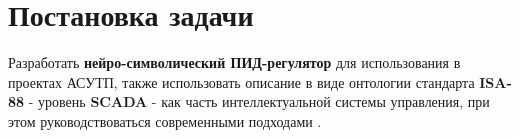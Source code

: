 \section{Постановка задачи}

Разработать \textbf{нейро-символический ПИД-регулятор} для использования в проектах АСУТП, также использовать описание в виде онтологии стандарта \textbf{ISA-88} - уровень \textbf{SCADA} - как часть интеллектуальной системы управления, при этом руководствоваться современными подходами \cite{Бурков2022}.
